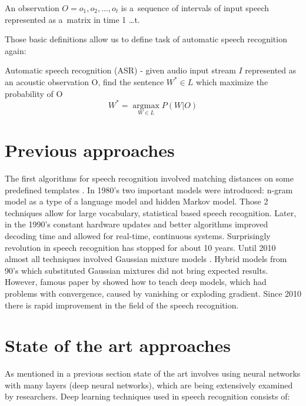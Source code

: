 \begin{definition}
	An observation $O = o_1,o_2,\dots,o_t$ is a~sequence of intervals of input speech represented as a~matrix in time 1 \dots  t.
\end{definition}

Those basic definitions allow us to define task of automatic speech recognition again: 

\begin{definition}
	Automatic speech recognition (ASR) - given audio input stream $I$ represented as an acoustic observation O, find the sentence $W^* \in L$ which maximize the probability of O
\begin{equation} 
W^*=\underset{W \in L}{\operatorname{argmax}} P(W|O)
\end{equation}

\end{definition}

\section{Previous approaches}
The first algorithms for speech recognition involved matching distances on some predefined templates \parencite{juang_automatic_2005}. In 1980's two important models were introduced: n-gram model as a type of a language model and hidden Markov model. Those 2 techniques allow for large vocabulary, statistical based speech recognition. Later, in the 1990's constant hardware updates and better algorithms improved decoding time and allowed for real-time, continuous systems. Surprisingly revolution in speech recognition has stopped for about 10 years. Until 2010 almost all techniques involved Gaussian mixture models \parencite{yu_automatic_2015}. Hybrid models from 90's which substituted Gaussian mixtures did not bring expected results. However, famous paper by \textcite{hinton_fast_2006} showed how to teach deep models, which had problems with convergence, caused by vanishing or exploding gradient. Since 2010 there is rapid improvement in the field of the speech recognition.

\section{State of the art approaches}
As mentioned in a previous section state of the art involves using neural networks with many layers (deep neural networks), which are being extensively examined by researchers. Deep learning techniques used in speech recognition consists of:


